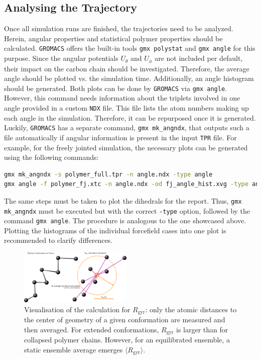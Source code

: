 \documentclass[9pt,tutorial]{livecoms}
\newcommand{\code}[1]{\colorbox{light-gray}{\texttt{#1}}}
\begin{document}
\subsection*{Analysing the Trajectory}
Once all simulation runs are finished, the trajectories need to be analyzed. Herein, angular properties and statistical polymer properties should be calculated. \texttt{GROMACS} offers the built-in tools \code{gmx polystat} and \code{gmx angle} for this purpose.
Since the angular potentials $U_\theta$ and $U_\phi$ are not included per default, their impact on the carbon chain should be investigated. Therefore, the average angle should be plotted vs. the simulation time. Additionally, an angle histogram should be generated. Both plots can be done by \texttt{GROMACS} via \code{gmx angle}. However, this command needs information about the triplets involved in one angle provided in a custom \texttt{NDX} file. This file lists the atom numbers making up each angle in the simulation. Therefore, it can be repurposed once it is generated. Luckily, \texttt{GROMACS} has a separate command, \code{gmx mk\_angndx}, that outputs such a file automatically if angular information is present in the input \texttt{TPR} file. For example, for the freely jointed simulation, the necessary plots can be generated using the following commands:
\begin{lstlisting}[language=bash]
gmx mk_angndx -s polymer_full.tpr -n angle.ndx -type angle
gmx angle -f polymer_fj.xtc -n angle.ndx -od fj_angle_hist.xvg -type angle -ov fj_angle.xvg
\end{lstlisting}
The same steps must be taken to plot the dihedrals for the report. Thus, \code{gmx mk\_angndx} must be executed but with the correct \code{-type} option, followed by the command \code{gmx angle}. The procedure is analogous to the one showcased above. Plotting the histograms of the individual forcefield cases into one plot is recommended to clarify differences.\\
\begin{figure}[H]
    \centering
    \includegraphics[width=0.48\textwidth]{figures/rgyr.png}
    \caption{Visualisation of the calculation for $R_\text{gyr}$: only the atomic distances to the center of geometry of a given conformation are measured and then averaged. For extended conformations, $R_\text{gyr}$ is larger than for collapsed polymer chains. However, for an equilibrated ensemble, a static ensemble average emerges $\langle R_\text{gyr}\rangle$.}
    \label{fig:rgyr}
\end{figure}
\end{document}
